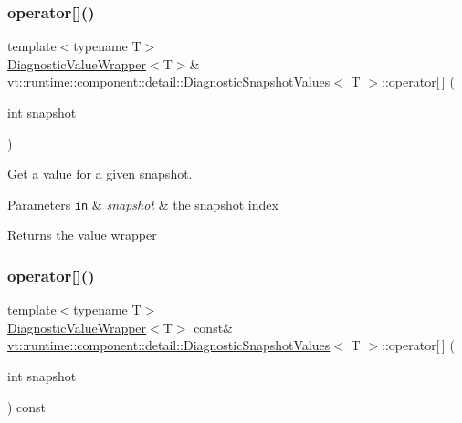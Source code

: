 \subsubsection{\texorpdfstring{operator[]()}{operator[]()}\hspace{0.1cm}{\footnotesize\ttfamily [1/2]}}
{\footnotesize\ttfamily template$<$typename T$>$ \\
\hyperlink{structvt_1_1runtime_1_1component_1_1detail_1_1_diagnostic_value_wrapper}{Diagnostic\+Value\+Wrapper}$<$T$>$\& \hyperlink{structvt_1_1runtime_1_1component_1_1detail_1_1_diagnostic_snapshot_values}{vt\+::runtime\+::component\+::detail\+::\+Diagnostic\+Snapshot\+Values}$<$ T $>$\+::operator\mbox{[}$\,$\mbox{]} (\begin{DoxyParamCaption}\item[{int}]{snapshot }\end{DoxyParamCaption})\hspace{0.3cm}{\ttfamily [inline]}}



Get a value for a given snapshot. 


\begin{DoxyParams}[1]{Parameters}
\mbox{\tt in}  & {\em snapshot} & the snapshot index\\
\hline
\end{DoxyParams}
\begin{DoxyReturn}{Returns}
the value wrapper 
\end{DoxyReturn}
\mbox{\label{structvt_1_1runtime_1_1component_1_1detail_1_1_diagnostic_snapshot_values_a59ea89a8ada16ca5e96e10f418647963}} 
\subsubsection{\texorpdfstring{operator[]()}{operator[]()}\hspace{0.1cm}{\footnotesize\ttfamily [2/2]}}
{\footnotesize\ttfamily template$<$typename T$>$ \\
\hyperlink{structvt_1_1runtime_1_1component_1_1detail_1_1_diagnostic_value_wrapper}{Diagnostic\+Value\+Wrapper}$<$T$>$ const\& \hyperlink{structvt_1_1runtime_1_1component_1_1detail_1_1_diagnostic_snapshot_values}{vt\+::runtime\+::component\+::detail\+::\+Diagnostic\+Snapshot\+Values}$<$ T $>$\+::operator\mbox{[}$\,$\mbox{]} (\begin{DoxyParamCaption}\item[{int}]{snapshot }\end{DoxyParamCaption}) const\hspace{0.3cm}{\ttfamily [inline]}}



